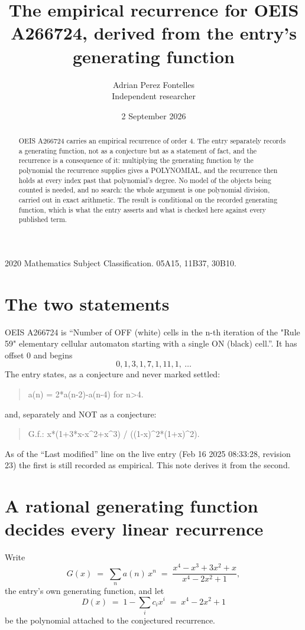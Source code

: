 \documentclass[11pt,a4paper]{article}
\title{The empirical recurrence for OEIS A266724, derived from the entry's generating function}
\author{Adrian Perez Fontelles\\ \small Independent researcher}
\date{2 September 2026}
\theoremstyle{plain}
\theoremstyle{definition}
\begin{document}
\maketitle

\begin{abstract}
OEIS A266724 carries an empirical recurrence of order $4$. The entry separately records a
generating function, not as a conjecture but as a statement of fact, and the recurrence is a
consequence of it: multiplying the generating function by the polynomial the recurrence
supplies gives a POLYNOMIAL, and the recurrence then holds at every index past that
polynomial's degree. No model of the objects being counted is needed, and no search: the
whole argument is one polynomial division, carried out in exact arithmetic. The result is
conditional on the recorded generating function, which is what the entry asserts and what is
checked here against every published term.
\end{abstract}

\noindent\small 2020 Mathematics Subject Classification. 05A15, 11B37, 30B10.\normalsize

\section{The two statements}

OEIS A266724 is ``Number of OFF (white) cells in the n-th iteration of the "Rule 59" elementary cellular automaton starting with a single ON (black) cell.''. It has offset $0$ and begins
\[
0, 1, 3, 1, 7, 1, 11, 1,\ \dots
\]
The entry states, as a conjecture and never marked settled:
\begin{quote}
a(n) = 2*a(n-2)-a(n-4) for n>4.
\end{quote}
and, separately and NOT as a conjecture:
\begin{quote}
G.f.: x*(1+3*x-x\^{}2+x\^{}3) / ((1-x)\^{}2*(1+x)\^{}2).
\end{quote}
As of the ``Last modified'' line on the live entry (Feb 16 2025 08:33:28, revision 23) the first is still
recorded as empirical. This note derives it from the second.

\section{A rational generating function decides every linear recurrence}

Write
\[
G(x)\;=\;\sum_{n}a(n)\,x^{n}\;=\;\frac{x^{4} - x^{3} + 3 x^{2} + x}{x^{4} - 2 x^{2} + 1},
\]
the entry's own generating function, and let
\[
D(x)\;=\;1-\sum_i c_i x^{i}\;=\;x^{4} - 2 x^{2} + 1
\]
be the polynomial attached to the conjectured recurrence.
\end{document}

